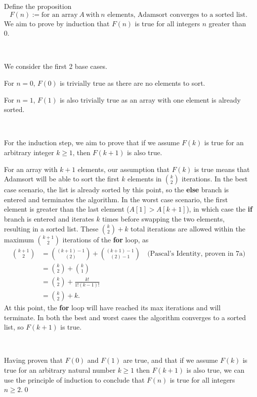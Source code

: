 \documentclass{article}
\begin{document}
Define the proposition
\begin{equation*}
F( n) :=\text{for an array} \ A\ \text{with} \ n\text{ elements, Adamsort converges to a sorted list} .
\end{equation*}
We aim to prove by induction that $F( n)$ is true for all integers $n$ greater than 0.

\

We consider the first 2 base cases. 

For $n=0$, $F( 0)$ is trivially true as there are no elements to sort.

For $n=1$, $F( 1)$ is also trivially true as an array with one element is already sorted.

\

For the induction step, we aim to prove that if we assume $F( k)$ is true for an arbitrary integer $k\geq 1$, then $F( k+1)$ is also true.

For an array with $k+1$ elements, our assumption that $F(k)$ is true means that Adamsort will be able to sort the first $k$ elements in $\binom{k}{2}$ iterations. In the best case scenario, the list is already sorted by this point, so the \textbf{else} branch is entered and terminates the algorithm. In the worst case scenario, the first element is greater than the last element ($A[ 1]  >A[ k+1]$), in which case the \textbf{if} branch is entered and iterates $k$ times before swapping the two elements, resulting in a sorted list. These $\binom{k}{2} + k$ total iterations are allowed within the maximum $\binom{k+1}{2}$ iterations of the \textbf{for} loop, as 
\begin{align*}
\binom{k+1}{2} & =\binom{( k+1) -1}{( 2)} +\binom{( k+1) -1}{( 2) -1} \quad \text{(Pascal's Identity, proven in 7a)}\\
 & =\binom{k}{2} +\binom{k}{1}\\
 & =\binom{k}{2} +\frac{k!}{1!( k-1) !}\\
 & =\binom{k}{2} +k.
\end{align*}
At this point, the \textbf{for} loop will have reached its max iterations and will terminate. In both the best and worst cases the algorithm converges to a sorted list, so $F( k+1)$ is true.

\

Having proven that $F(0)$ and $F( 1)$ are true, and that if we assume $F(k)$ is true for an arbitrary natural number $k\geq 1$ then $F(k+1)$ is also true, we can use the principle of induction to conclude that $F(n)$ is true for all integers $n\geq 2$.\qed 
\end{document}
